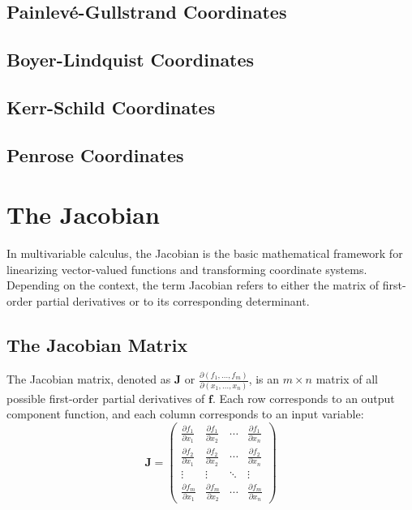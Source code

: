 \subsection{Painlevé-Gullstrand Coordinates}\label{subsec:painleve-gullstrand-coordinates}
\subsection{Boyer-Lindquist  Coordinates}\label{subsec:boyer-lindquist-coordinates}
\subsection{Kerr-Schild Coordinates}\label{subsec:kerr-schild-coordinates}
\subsection{Penrose Coordinates}\label{subsec:penrose-coordinates}


\section{The Jacobian}\label{sec:jacobian}

In multivariable calculus, 
the Jacobian is the basic mathematical framework for linearizing vector-valued functions 
and transforming coordinate systems. 
Depending on the context, the term Jacobian refers to either the matrix 
of first-order partial derivatives or to its corresponding determinant.~\cite{stewart2020calculus}

\subsection{The Jacobian Matrix}\label{subsec:jacobian-matrix}

The Jacobian matrix, 
denoted as $\mathbf{J}$ or $\frac{\partial(f_1, \dots, f_m)}{\partial(x_1, \dots, x_n)}$, 
is an $m \times n$ matrix of all possible first-order partial derivatives of $\mathbf{f}$. 
Each row corresponds to an output component function, and each column corresponds to an input variable:
\begin{equation}
    \mathbf{J} = \begin{pmatrix}
        \frac{\partial f_1}{\partial x_1} & \frac{\partial f_1}{\partial x_2} & \cdots & \frac{\partial f_1}{\partial x_n} \\
        \frac{\partial f_2}{\partial x_1} & \frac{\partial f_2}{\partial x_2} & \cdots & \frac{\partial f_2}{\partial x_n} \\
        \vdots & \vdots & \ddots & \vdots \\
        \frac{\partial f_m}{\partial x_1} & \frac{\partial f_m}{\partial x_2} & \cdots & \frac{\partial f_m}{\partial x_n}
    \end{pmatrix}
\end{equation}

